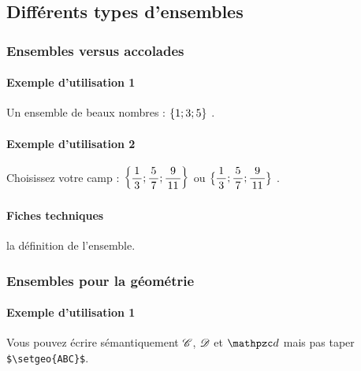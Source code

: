 \documentclass[12pt,a4paper]{article}
\theoremstyle{definition}
\begin{document}
\subsection{Différents types d'ensembles}

\subsubsection{Ensembles versus accolades}

\paragraph{Exemple d'utilisation 1}

\begin{tcblisting}{}
Un ensemble de beaux nombres : $\setgene{1 ; 3 ; 5}$ .
\end{tcblisting}


\paragraph{Exemple d'utilisation 2}

\begin{tcblisting}{}
Choisissez votre camp :
$\displaystyle \setgene{\frac{1}{3} ; \frac{5}{7} ; \frac{9}{11}}$
ou
$\displaystyle \setgene*{\frac{1}{3} ; \frac{5}{7} ; \frac{9}{11}}$ .
\end{tcblisting}


\paragraph{Fiches techniques}



\IDarg{} la définition de l'ensemble.



\subsubsection{Ensembles pour la géométrie} \label{set-geo}

\paragraph{Exemple d'utilisation 1}

\begin{tcblisting}{}
Vous pouvez écrire sémantiquement $\setgeo{C}$, $\setgeo{D}$ et $\setgeo{d}$ mais pas
taper \verb+$\setgeo{ABC}$+.
\end{tcblisting}
\end{document}
